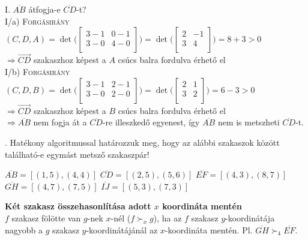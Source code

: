 \documentclass[12pt]{article}
\begin{document}
\noindent I. $\overline{AB}$ átfogja-e $\overline{CD}$-t? \\
I/a) {\scshape Forgásirány}$(C,D,A)=\det\Bigg(\begin{bmatrix}
3-1 & 0-1 \\
3-0 & 4-0 \\
\end{bmatrix}\Bigg)=\det\Bigg(\begin{bmatrix}
2  & -1 \\
3  & 4 \\
\end{bmatrix}\Bigg) = 8+3 > 0$ \\$\Rightarrow \overrightarrow{CD}$ szakaszhoz 
képest a $A$ csúcs balra fordulva érhető el  \\
I/b) {\scshape Forgásirány}$(C,D,B)=\det\Bigg(\begin{bmatrix}
3-1 & 2-1 \\
3-0 & 2-0 \\
\end{bmatrix}\Bigg)=\det\Bigg(\begin{bmatrix}
2  & 1 \\
3  & 2 \\
\end{bmatrix}\Bigg) = 6-3 > 0$ \\$\Rightarrow \overrightarrow{CD}$ szakaszhoz 
képest a $B$ csúcs balra fordulva érhető el  \\
$\Rightarrow \overline{AB}$ nem fogja át a $\overline{CD}$-re illeszkedő 
egyenest, így $\overline{AB}$ nem is metszheti $\overline{CD}$-t.


. Hatékony algoritmussal határozzuk meg, hogy az alábbi szakaszok 
között található-e egymást metsző szakaszpár!

\noindent $\overline{AB}=[(1,5),(4,4)]$ \hfill $\overline{CD}=[(2,5),(5,6)]$ 
\hfill
$\overline{EF}=[(4,3),(8,7)]$ \hfill $\overline{GH}=[(4,7),(7,5)]$ \hfill 
$\overline{IJ}=[(5,3),(7,3)]$

\textbf{Két szakasz összehasonlítása adott $x$ koordináta mentén}\\
$f$ szakasz fölötte van $g$-nek $x$-nél ($f \succ_x g$), ha az $f$ szakasz $y$-koordinátája nagyobb a $g$ szakasz $y$-koordinátájánál az $x$-koordináta mentén.
Pl. $\overline{GH} \succ_4 \overline{EF}$.
\end{document}
